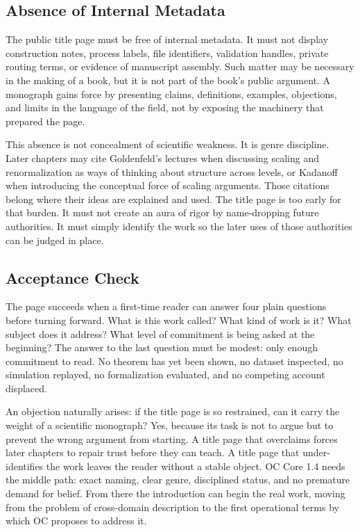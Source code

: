 \documentclass[11pt,a4paper,openany]{book}
\begin{document}
\subsection{Absence of Internal Metadata}
The public title page must be free of internal metadata. It must not display construction notes, process labels, file identifiers, validation handles, private routing terms, or evidence of manuscript assembly. Such matter may be necessary in the making of a book, but it is not part of the book's public argument. A monograph gains force by presenting claims, definitions, examples, objections, and limits in the language of the field, not by exposing the machinery that prepared the page. \cite{stauffer_percolation,grimmett_percolation}\par
This absence is not concealment of scientific weakness. It is genre discipline. Later chapters may cite Goldenfeld's lectures when discussing scaling and renormalization as ways of thinking about structure across levels, or Kadanoff when introducing the conceptual force of scaling arguments. Those citations belong where their ideas are explained and used. The title page is too early for that burden. It must not create an aura of rigor by name-dropping future authorities. It must simply identify the work so the later uses of those authorities can be judged in place.\par
\subsection{Acceptance Check}
The page succeeds when a first-time reader can answer four plain questions before turning forward. What is this work called? What kind of work is it? What subject does it address? What level of commitment is being asked at the beginning? The answer to the last question must be modest: only enough commitment to read. No theorem has yet been shown, no dataset inspected, no simulation replayed, no formalization evaluated, and no competing account displaced. \cite{stauffer_percolation,grimmett_percolation}\par
An objection naturally arises: if the title page is so restrained, can it carry the weight of a scientific monograph? Yes, because its task is not to argue but to prevent the wrong argument from starting. A title page that overclaims forces later chapters to repair trust before they can teach. A title page that under-identifies the work leaves the reader without a stable object. OC Core 1.4 needs the middle path: exact naming, clear genre, disciplined status, and no premature demand for belief. From there the introduction can begin the real work, moving from the problem of cross-domain description to the first operational terms by which OC proposes to address it.\par
\end{document}

